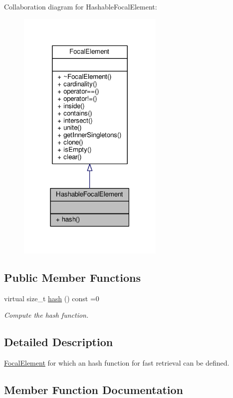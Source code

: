Collaboration diagram for Hashable\+Focal\+Element\+:\nopagebreak
\begin{figure}[H]
\begin{center}
\leavevmode
\includegraphics[width=198pt]{classHashableFocalElement__coll__graph}
\end{center}
\end{figure}
\subsection*{Public Member Functions}
\begin{DoxyCompactItemize}
\item 
virtual size\+\_\+t \hyperlink{classHashableFocalElement_a8b7bfbf1e107fa5a6cfc5033db196c63}{hash} () const =0
\begin{DoxyCompactList}\small\item\em Compute the hash function. \end{DoxyCompactList}\end{DoxyCompactItemize}


\subsection{Detailed Description}
\hyperlink{classFocalElement}{Focal\+Element} for which an hash function for fast retrieval can be defined. 

\subsection{Member Function Documentation}
